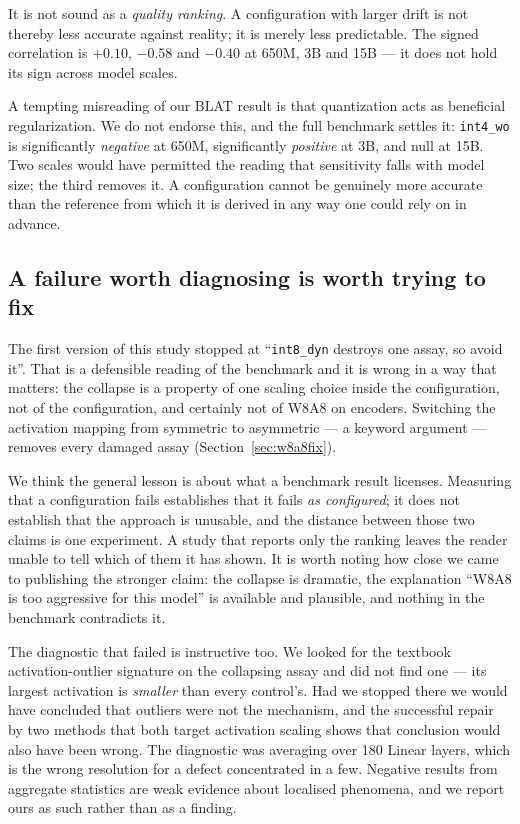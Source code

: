 \documentclass[11pt]{article}
\newcommand{\cfg}[1]{\texttt{#1}}
\begin{document}
It is not sound as a \emph{quality ranking}. A configuration with larger drift
is not thereby less accurate against reality; it is merely less predictable. The
signed correlation is $+0.10$, $-0.58$ and $-0.40$ at 650M, 3B and 15B --- it
does not hold its sign across model scales.

A tempting misreading of our BLAT result is that quantization acts as beneficial
regularization. We do not endorse this, and the full benchmark settles it:
\cfg{int4\_wo} is significantly \emph{negative} at 650M, significantly
\emph{positive} at 3B, and null at 15B. Two scales would have permitted the
reading that sensitivity falls with model size; the third removes it. A
configuration cannot be genuinely more accurate than the reference from which it
is derived in any way one could rely on in advance.

\subsection{A failure worth diagnosing is worth trying to fix}

The first version of this study stopped at ``\cfg{int8\_dyn} destroys one assay,
so avoid it''. That is a defensible reading of the benchmark and it is wrong in
a way that matters: the collapse is a property of one scaling choice inside the
configuration, not of the configuration, and certainly not of W8A8 on encoders.
Switching the activation mapping from symmetric to asymmetric --- a keyword
argument --- removes every damaged assay (Section~\ref{sec:w8a8fix}).

We think the general lesson is about what a benchmark result licenses. Measuring
that a configuration fails establishes that it fails \emph{as configured}; it
does not establish that the approach is unusable, and the distance between those
two claims is one experiment. A study that reports only the ranking leaves the
reader unable to tell which of them it has shown. It is worth noting how close
we came to publishing the stronger claim: the collapse is dramatic, the
explanation ``W8A8 is too aggressive for this model'' is available and
plausible, and nothing in the benchmark contradicts it.

The diagnostic that failed is instructive too. We looked for the textbook
activation-outlier signature on the collapsing assay and did not find one ---
its largest activation is \emph{smaller} than every control's. Had we stopped
there we would have concluded that outliers were not the mechanism, and the
successful repair by two methods that both target activation scaling shows that
conclusion would also have been wrong. The diagnostic was averaging over 180
Linear layers, which is the wrong resolution for a defect concentrated in a few.
Negative results from aggregate statistics are weak evidence about localised
phenomena, and we report ours as such rather than as a finding.
\end{document}
